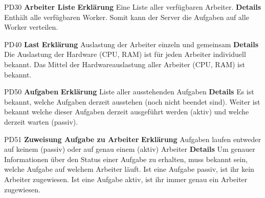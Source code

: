 \documentclass[a4paper,12pt]{article}
\begin{document}
\begin{itemize}[nosep]
\begin{minipage}[t]{\linewidth}
\item[PD30] \textbf{Arbeiter Liste}
\subitem \textbf{Erklärung} Eine Liste aller verfügbaren Arbeiter.
\subitem \textbf{Details} Enthält alle verfügbaren Worker.\newline
Somit kann der Server die Aufgaben auf alle Worker verteilen.
\end{minipage}
\vspace{20mm}

\begin{minipage}[t]{\linewidth}
\item[PD40] \textbf{Last}
\subitem \textbf{Erklärung} Auslastung der Arbeiter einzeln und gemeinsam
\subitem \textbf{Details} Die Auslastung der Hardware (CPU, RAM) ist für jeden Arbeiter individuell bekannt.\newline
Das Mittel der Hardwareauslastung aller Arbeiter (CPU, RAM) ist bekannt.
\end{minipage}
\vspace{20mm}

\begin{minipage}[t]{\linewidth}
\item[PD50] \textbf{Aufgaben}
\subitem \textbf{Erklärung} Liste aller ausstehenden Aufgaben
\subitem \textbf{Details} Es ist bekannt, welche Aufgaben derzeit ausstehen (noch nicht beendet sind). Weiter ist bekannt welche dieser Aufgaben derzeit ausgeführt werden (aktiv) und welche derzeit warten (passiv).
\end{minipage}
\vspace{20mm}

\begin{minipage}[t]{\linewidth}
\item[PD51] \textbf{Zuweisung Aufgabe zu Arbeiter}
\subitem \textbf{Erklärung} Aufgaben laufen entweder auf keinem (passiv) oder auf genau einem (aktiv) Arbeiter
\subitem \textbf{Details} Um genauer Informationen über den Status einer Aufgabe zu erhalten, muss bekannt sein, welche Aufgabe auf welchem Arbeiter läuft.\newline
Ist eine Aufgabe passiv, ist ihr kein Arbeiter zugewiesen.\newline
Ist eine Aufgabe aktiv, ist ihr immer genau ein Arbeiter zugewiesen.
\end{minipage}
\vspace{20mm}


\end{itemize}
\end{document}
